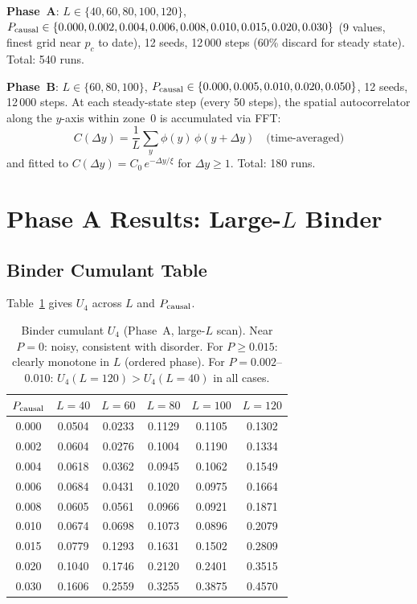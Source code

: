 \documentclass[12pt,a4paper]{article}
\begin{document}
\textbf{Phase~A}: $L \in \{40, 60, 80, 100, 120\}$,
$P_{\rm causal} \in \{0.000, 0.002, 0.004, 0.006, 0.008, 0.010, 0.015, 0.020, 0.030\}$
(9 values, finest grid near $p_c$ to date),
12 seeds, 12\,000 steps (60\% discard for steady state).
Total: 540 runs.

\textbf{Phase~B}: $L \in \{60, 80, 100\}$,
$P_{\rm causal} \in \{0.000, 0.005, 0.010, 0.020, 0.050\}$,
12 seeds, 12\,000 steps.
At each steady-state step (every 50 steps), the spatial autocorrelator
along the $y$-axis within zone~0 is accumulated via FFT:
\begin{equation}
C(\Delta y) = \frac{1}{L}\sum_y \phi(y)\,\phi(y+\Delta y)
\quad\text{(time-averaged)}
\end{equation}
and fitted to $C(\Delta y) = C_0\,e^{-\Delta y / \xi}$ for $\Delta y \geq 1$.
Total: 180 runs.

\section{Phase A Results: Large-$L$ Binder}

\subsection{Binder Cumulant Table}

Table~\ref{tab:u4_A} gives $U_4$ across $L$ and $P_{\rm causal}$.

\begin{table}[h]
\centering
\caption{Binder cumulant $U_4$ (Phase~A, large-$L$ scan).
Near $P=0$: noisy, consistent with disorder.
For $P \geq 0.015$: clearly monotone in $L$ (ordered phase).
For $P = 0.002$--$0.010$: $U_4(L=120) > U_4(L=40)$ in all cases.}
\label{tab:u4_A}
\begin{tabular}{cccccc}
\toprule
$P_{\rm causal}$ & $L=40$ & $L=60$ & $L=80$ & $L=100$ & $L=120$ \\
\midrule
0.000 & 0.0504 & 0.0233 & 0.1129 & 0.1105 & 0.1302 \\
0.002 & 0.0604 & 0.0276 & 0.1004 & 0.1190 & 0.1334 \\
0.004 & 0.0618 & 0.0362 & 0.0945 & 0.1062 & 0.1549 \\
0.006 & 0.0684 & 0.0431 & 0.1020 & 0.0975 & 0.1664 \\
0.008 & 0.0605 & 0.0561 & 0.0966 & 0.0921 & 0.1871 \\
0.010 & 0.0674 & 0.0698 & 0.1073 & 0.0896 & 0.2079 \\
0.015 & 0.0779 & 0.1293 & 0.1631 & 0.1502 & 0.2809 \\
0.020 & 0.1040 & 0.1746 & 0.2120 & 0.2401 & 0.3515 \\
0.030 & 0.1606 & 0.2559 & 0.3255 & 0.3875 & 0.4570 \\
\bottomrule
\end{tabular}
\end{table}
\end{document}

